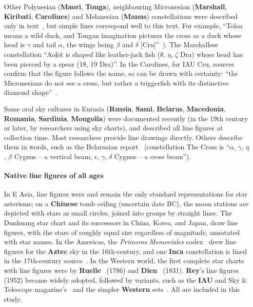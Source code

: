\documentclass[10pt]{article}
\begin{document}
Other Polynesian ({\bf Maori}, {\bf Tonga}), neighbouring Micronesian ({\bf Marshall}, {\bf Kiribati}, {\bf Carolines}) and Melanesian ({\bf Manus}) constellations were described only in text~\cite{orchiston2000polynesian,collocott1922tongan,MEOO,KED,goodenough1951native}, but simple lines correspond well to this text. For example, ``Toloa means a wild duck, and Tongan imagination pictures the cross as a duck whose head is $\gamma$ and tail $\alpha$, the wings being $\beta$ and $\delta$ [Cru]''~\cite{collocott1922tongan}). The Marshallese constellation ``Ao\d{l}\={o}t is shaped like leather-jack fish ($\theta$, $\eta$, $\zeta$ Dra) whose head has been pierced by a spear (18, 19 Dra)''. In the Carolines, for IAU Cru, sources confirm that the figure follows the name, so can be drawn with certainty: ``the Micronesians do not see a cross, but rather a triggerfish with its distinctive diamond shape''~\cite{chadwick2017great}.

Some oral sky cultures in Eurasia ({\bf Russia}, {\bf Sami}, {\bf Belarus}, {\bf Macedonia}, {\bf Romania}, {\bf Sardinia}, {\bf Mongolia}) were documented recently (in the 19th century or later, by researchers using sky charts), and described all line figures at collection time. Most researchers provide line drawings directly. Others describe them in words, such as the Belarusian report~\cite{avilin2008astronyms} (constellation The Cross is ``$\alpha$, $\gamma$, $\eta$, $\beta$ Cygnus -- a vertical beam, $\epsilon$, $\gamma$, $\delta$ Cygnus -- a cross beam''). 

\paragraph{Native line figures of all ages} In E Asia, line figures were and remain the only standard representations for star asterisms; on a {\bf Chinese} tomb ceiling (uncertain date BC), the moon stations are depicted with stars as small circles, joined into groups by straight lines. The Dunhuang star chart and its successors in China, Korea, and Japan, draw line figures, with the stars of roughly equal size regardless of magnitude, annotated with star names. In the Americas, the \textit{Primeros Memoriales} codex~\cite{PrimerosMemoriales} drew line figures for the {\bf Aztec} sky in the 16th-century, and one {\bf Inca} constellation is lined in the 17th-century source~\cite{lehmann1928coricancha}. In the Western world, the first complete star charts with line figures were by {\bf Ruelle}~\cite{Ruelle} (1786) and {\bf Dien}~\cite{Dien} (1831). {\bf Rey}'s line figures~\cite{rey1952stars} (1952) became widely adopted, followed by variants, such as the {\bf IAU} and Sky \& Telescope magazine's~\cite{IAU} and the simpler {\bf Western} sets~\cite{Stellarium}. All are included in this study.
\end{document}
